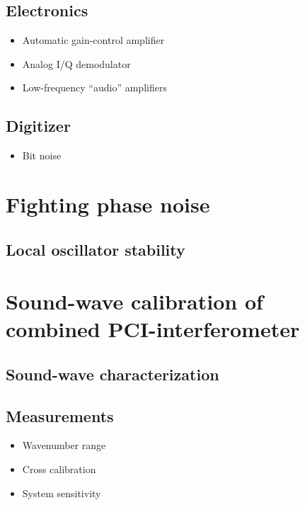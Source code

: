 \subsection{Electronics}
\begin{itemize}
  \item Automatic gain-control amplifier
  \item Analog I/Q demodulator
  \item Low-frequency ``audio'' amplifiers
\end{itemize}
\subsection{Digitizer}
\begin{itemize}
  \item Bit noise
\end{itemize}




\section{Fighting phase noise}
\subsection{Local oscillator stability}


\section{Sound-wave calibration of combined PCI-interferometer}
\subsection{Sound-wave characterization}
\subsection{Measurements}
\begin{itemize}
  \item Wavenumber range
  \item Cross calibration
  \item System sensitivity
\end{itemize}


